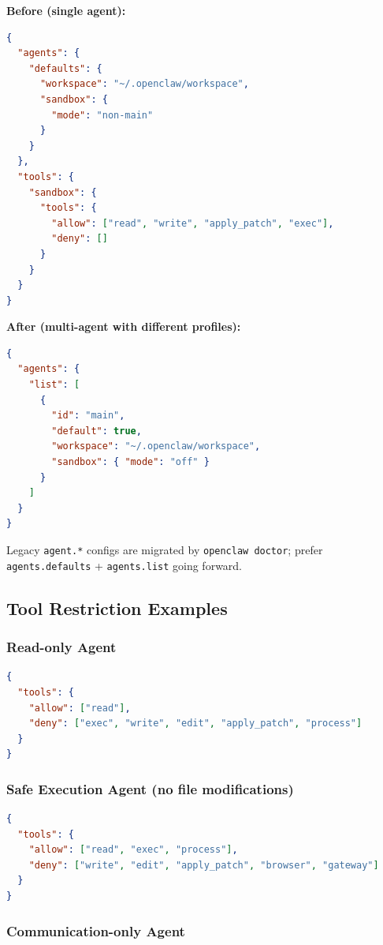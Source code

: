 \textbf{Before (single agent):}

\begin{lstlisting}[language=json]
{
  "agents": {
    "defaults": {
      "workspace": "~/.openclaw/workspace",
      "sandbox": {
        "mode": "non-main"
      }
    }
  },
  "tools": {
    "sandbox": {
      "tools": {
        "allow": ["read", "write", "apply_patch", "exec"],
        "deny": []
      }
    }
  }
}
\end{lstlisting}


\textbf{After (multi-agent with different profiles):}

\begin{lstlisting}[language=json]
{
  "agents": {
    "list": [
      {
        "id": "main",
        "default": true,
        "workspace": "~/.openclaw/workspace",
        "sandbox": { "mode": "off" }
      }
    ]
  }
}
\end{lstlisting}


Legacy \texttt{agent.*} configs are migrated by \texttt{openclaw doctor}; prefer \texttt{agents.defaults} + \texttt{agents.list} going forward.

\hrulefill


\subsection{Tool Restriction Examples}


\subsubsection{Read-only Agent}


\begin{lstlisting}[language=json]
{
  "tools": {
    "allow": ["read"],
    "deny": ["exec", "write", "edit", "apply_patch", "process"]
  }
}
\end{lstlisting}


\subsubsection{Safe Execution Agent (no file modifications)}


\begin{lstlisting}[language=json]
{
  "tools": {
    "allow": ["read", "exec", "process"],
    "deny": ["write", "edit", "apply_patch", "browser", "gateway"]
  }
}
\end{lstlisting}


\subsubsection{Communication-only Agent}


